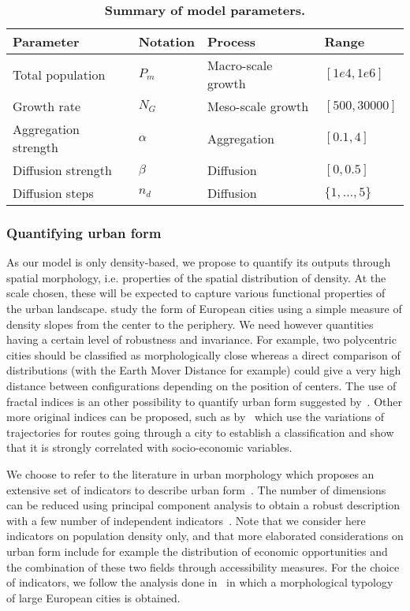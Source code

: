 \documentclass[10pt,letterpaper]{article}
\begin{document}
\begin{table}[!ht]
\caption{{\bf Summary of model parameters.}}
\begin{tabular}{|l|l|l|l|}
\hline
Parameter & Notation & Process & Range\\ \hline
Total population & $P_m$ & Macro-scale growth & $[1e4,1e6]$\\ \hline
Growth rate & $N_G$ & Meso-scale growth  & $[500,30000]$\\ \hline
Aggregation strength & $\alpha$ & Aggregation & $[0.1,4]$\\ \hline
Diffusion strength & $\beta$ & Diffusion & $[0,0.5]$\\ \hline
Diffusion steps & $n_d$ & Diffusion & $\{1,\ldots , 5\}$\\ \hline
\end{tabular}
\label{tab:parameters}
\end{table}


\subsubsection*{Quantifying urban form}


As our model is only density-based, we propose to quantify its outputs through spatial morphology, i.e. properties of the spatial distribution of density. At the scale chosen, these will be expected to capture various functional properties of the urban landscape. \cite{guerois2008built} study the form of European cities using a simple measure of density slopes from the center to the periphery. We need however quantities having a certain level of robustness and invariance. For example, two polycentric cities should be classified as morphologically close whereas a direct comparison of distributions (with the Earth Mover Distance for example) could give a very high distance between configurations depending on the position of centers. The use of fractal indices is an other possibility to quantify urban form suggested by~\cite{2016arXiv160808839C}. Other more original indices can be proposed, such as by~\cite{lee2017morphology} which use the variations of trajectories for routes going through a city to establish a classification and show that it is strongly correlated with socio-economic variables.

We choose to refer to the literature in urban morphology which proposes an extensive set of indicators to describe urban form~\cite{tsai2005quantifying}. The number of dimensions can be reduced using principal component analysis to obtain a robust description with a few number of independent indicators~\cite{Schwarz201029}. Note that we consider here indicators on population density only, and that more elaborated considerations on urban form include for example the distribution of economic opportunities and the combination of these two fields through accessibility measures. For the choice of indicators, we follow the analysis done in~\cite{le2015forme} in which a morphological typology of large European cities is obtained.
\end{document}
